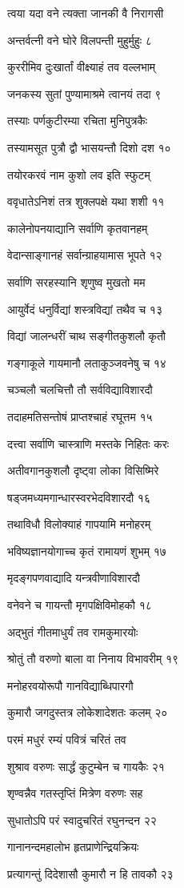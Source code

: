 त्वया यदा वने त्यक्ता जानकी वै निरागसी

अन्तर्वत्नी वने घोरे विलपन्ती मुहुर्मुहुः ८

कुररीमिव दुःखार्तां वीक्ष्याहं तव वल्लभाम्

जनकस्य सुतां पुण्यामाश्रमे त्वानयं तदा ९

तस्याः पर्णकुटीरम्या रचिता मुनिपुत्रकैः

तस्यामसूत पुत्रौ द्वौ भासयन्तौ दिशो दश १०

तयोरकरवं नाम कुशो लव इति स्फुटम्

ववृधातेऽनिशं तत्र शुक्लपक्षे यथा शशी ११

कालेनोपनयाद्यानि सर्वाणि कृतवानहम्

वेदान्साङ्गानहं सर्वान्ग्राहयामास भूपते १२

सर्वाणि सरहस्यानि शृणुष्व मुखतो मम

आयुर्वेदं धनुर्विद्यां शस्त्रविद्यां तथैव च १३

विद्यां जालन्धरीं चाथ सङ्गीतकुशलौ कृतौ

गङ्गाकूले गायमानौ लताकुञ्जवनेषु च १४

चञ्चलौ चलचित्तौ तौ सर्वविद्याविशारदौ

तदाहमतिसन्तोषं प्राप्तश्चाहं रघूत्तम १५

दत्त्वा सर्वाणि चास्त्राणि मस्तके निहितः करः

अतीवगानकुशलौ दृष्ट्वा लोका विसिष्मिरे

षड्जमध्यमगान्धारस्वरभेदविशारदौ १६

तथाविधौ विलोक्याहं गापयामि मनोहरम्

भविष्यज्ञानयोगाच्च कृतं रामायणं शुभम् १७

मृदङ्गपणवाद्यादि यन्त्रवीणाविशारदौ

वनेवने च गायन्तौ मृगपक्षिविमोहकौ १८

अद्भुतं गीतमाधुर्यं तव रामकुमारयोः

श्रोतुं तौ वरुणो बाला वा निनाय विभावरीम् १९

मनोहरवयोरूपौ गानविद्याब्धिपारगौ

कुमारौ जगदुस्तत्र लोकेशादेशतः कलम् २०

परमं मधुरं रम्यं पवित्रं चरितं तव

शुश्राव वरुणः सार्द्धं कुटुम्बेन च गायकैः २१

शृण्वन्नैव गतस्तृप्तिं मित्रेण वरुणः सह

सुधातोऽपि परं स्वादुचरितं रघुनन्दन २२

गानानन्दमहालोभ हृतप्राणेन्द्रियक्रियः

प्रत्यागन्तुं दिदेशासौ कुमारौ न हि तावकौ २३


